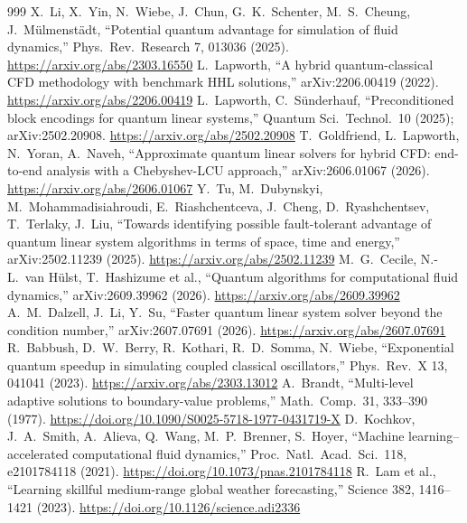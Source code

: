 \documentclass[10pt,a4paper]{article}
\begin{document}
\begin{thebibliography}{999}
 X.~Li, X.~Yin, N.~Wiebe, J.~Chun, G.~K.~Schenter, M.~S.~Cheung, J.~M\"ulmenst\"adt, ``Potential quantum advantage for simulation of fluid dynamics,'' Phys.\ Rev.\ Research 7, 013036 (2025). \url{https://arxiv.org/abs/2303.16550}
 L.~Lapworth, ``A hybrid quantum-classical CFD methodology with benchmark HHL solutions,'' arXiv:2206.00419 (2022). \url{https://arxiv.org/abs/2206.00419}
 L.~Lapworth, C.~S\"underhauf, ``Preconditioned block encodings for quantum linear systems,'' Quantum Sci.\ Technol.\ 10 (2025); arXiv:2502.20908. \url{https://arxiv.org/abs/2502.20908}
 T.~Goldfriend, L.~Lapworth, N.~Yoran, A.~Naveh, ``Approximate quantum linear solvers for hybrid CFD: end-to-end analysis with a Chebyshev-LCU approach,'' arXiv:2606.01067 (2026). \url{https://arxiv.org/abs/2606.01067}
 Y.~Tu, M.~Dubynskyi, M.~Mohammadisiahroudi, E.~Riashchentceva, J.~Cheng, D.~Ryashchentsev, T.~Terlaky, J.~Liu, ``Towards identifying possible fault-tolerant advantage of quantum linear system algorithms in terms of space, time and energy,'' arXiv:2502.11239 (2025). \url{https://arxiv.org/abs/2502.11239}
 M.~G.~Cecile, N.-L.~van H\"ulst, T.~Hashizume et al., ``Quantum algorithms for computational fluid dynamics,'' arXiv:2609.39962 (2026). \url{https://arxiv.org/abs/2609.39962}
 A.~M.~Dalzell, J.~Li, Y.~Su, ``Faster quantum linear system solver beyond the condition number,'' arXiv:2607.07691 (2026). \url{https://arxiv.org/abs/2607.07691}
 R.~Babbush, D.~W.~Berry, R.~Kothari, R.~D.~Somma, N.~Wiebe, ``Exponential quantum speedup in simulating coupled classical oscillators,'' Phys.\ Rev.\ X 13, 041041 (2023). \url{https://arxiv.org/abs/2303.13012}
 A.~Brandt, ``Multi-level adaptive solutions to boundary-value problems,'' Math.\ Comp.\ 31, 333--390 (1977). \url{https://doi.org/10.1090/S0025-5718-1977-0431719-X}
 D.~Kochkov, J.~A.~Smith, A.~Alieva, Q.~Wang, M.~P.~Brenner, S.~Hoyer, ``Machine learning--accelerated computational fluid dynamics,'' Proc.\ Natl.\ Acad.\ Sci.\ 118, e2101784118 (2021). \url{https://doi.org/10.1073/pnas.2101784118}
 R.~Lam et al., ``Learning skillful medium-range global weather forecasting,'' Science 382, 1416--1421 (2023). \url{https://doi.org/10.1126/science.adi2336}
\end{thebibliography}
\end{document}
